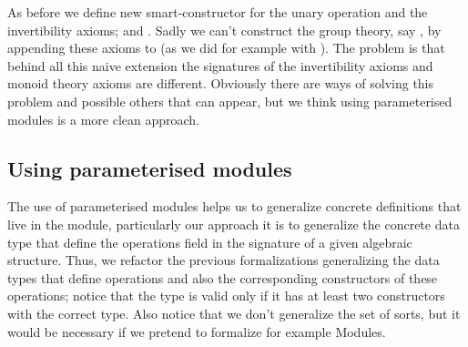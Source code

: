 As before we define new smart-constructor for the unary operation and the
invertibility axioms; \AgdaSpace{}%
\AgdaSymbol{=}\AgdaSpace{}%
\AgdaSpace{}%
\AgdaSymbol{(}\AgdaSpace{}%
\AgdaSpace{}%
\AgdaSymbol{(}\AgdaSpace{}%
\AgdaSymbol{))}\AgdaSpace{}%
\AgdaSpace{}%
 and
\AgdaSpace{}%
\AgdaSymbol{=}\AgdaSpace{}%
\AgdaSpace{}%
\AgdaSymbol{((}\AgdaSpace{}%
\AgdaSymbol{)}\AgdaSpace{}%
\AgdaSpace{}%
\AgdaSymbol{)}\AgdaSpace{}%
\AgdaSpace{}%
. Sadly we can't construct the group theory, say
, by appending these axioms to 
(as we did for example with ). The problem is that
behind all this naive extension the signatures of the invertibility axioms and
monoid theory axioms are different. Obviously there are ways of solving this
problem and possible others that can appear, but we think using parameterised
modules is a more clean approach.

\subsection{Using parameterised modules}

The use of parameterised modules helps us to generalize concrete definitions
that live in the module, particularly our approach it is to generalize the
concrete data type that define the operations field in the signature of a given
algebraic structure. Thus, we refactor the previous formalizations generalizing
the data types that define operations and also the corresponding constructors of
these operations; notice that the type  is valid only if
it has at least two constructors with the correct type. Also notice that
we don't generalize the set of sorts, but it would be necessary if we pretend
to formalize for example Modules.

